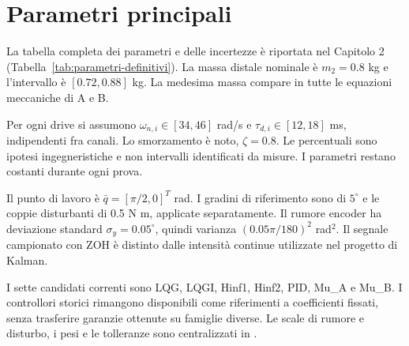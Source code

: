 \chapter{Parametri principali}\label{app:parametri}
La tabella completa dei parametri e delle incertezze è riportata nel Capitolo 2 (Tabella~\ref{tab:parametri-definitivi}). La massa distale nominale è $m_2=0.8$ kg e l'intervallo è $[0.72,0.88]$ kg. La medesima massa compare in tutte le equazioni meccaniche di A e B.

Per ogni drive si assumono $\omega_{n,i}\in[34,46]$ rad/s e $\tau_{d,i}\in[12,18]$ ms, indipendenti fra canali. Lo smorzamento è noto, $\zeta=0.8$. Le percentuali sono ipotesi ingegneristiche e non intervalli identificati da misure. I parametri restano costanti durante ogni prova.

Il punto di lavoro è $\bar q=[\pi/2,0]^T$ rad. I gradini di riferimento sono di $5^\circ$ e le coppie disturbanti di 0.5 N m, applicate separatamente. Il rumore encoder ha deviazione standard $\sigma_y=0.05^\circ$, quindi varianza $(0.05\pi/180)^2$ rad$^2$. Il segnale campionato con ZOH è distinto dalle intensità continue utilizzate nel progetto di Kalman.

I sette candidati correnti sono LQG, LQGI, Hinf1, Hinf2, PID, Mu\_A e Mu\_B. I controllori storici rimangono disponibili come riferimenti a coefficienti fissati, senza trasferire garanzie ottenute su famiglie diverse. Le scale di rumore e disturbo, i pesi e le tolleranze sono centralizzati in .
